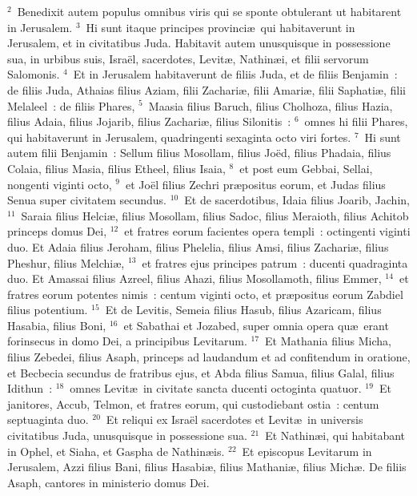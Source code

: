${}^{2}$~Benedixit autem populus omnibus viris qui se sponte obtulerant ut habitarent in Jerusalem.
${}^{3}$~Hi sunt itaque principes provinci\ae\ qui habitaverunt in Jerusalem, et in civitatibus Juda. Habitavit autem unusquisque in possessione sua, in urbibus suis, Isra\"el, sacerdotes, Levit\ae , Nathin\ae i, et filii servorum Salomonis.
${}^{4}$~Et in Jerusalem habitaverunt de filiis Juda, et de filiis Benjamin~: de filiis Juda, Athaias filius Aziam, filii Zachari\ae , filii Amari\ae , filii Saphati\ae , filii Melaleel~: de filiis Phares,
${}^{5}$~Maasia filius Baruch, filius Cholhoza, filius Hazia, filius Adaia, filius Jojarib, filius Zachari\ae , filius Silonitis~:
${}^{6}$~omnes hi filii Phares, qui habitaverunt in Jerusalem, quadringenti sexaginta octo viri fortes.
${}^{7}$~Hi sunt autem filii Benjamin~: Sellum filius Mosollam, filius Jo\"ed, filius Phadaia, filius Colaia, filius Masia, filius Etheel, filius Isaia,
${}^{8}$~et post eum Gebbai, Sellai, nongenti viginti octo,
${}^{9}$~et Jo\"el filius Zechri pr\ae positus eorum, et Judas filius Senua super civitatem secundus.
${}^{10}$~Et de sacerdotibus, Idaia filius Joarib, Jachin,
${}^{11}$~Saraia filius Helci\ae , filius Mosollam, filius Sadoc, filius Meraioth, filius Achitob princeps domus Dei,
${}^{12}$~et fratres eorum facientes opera templi~: octingenti viginti duo. Et Adaia filius Jeroham, filius Phelelia, filius Amsi, filius Zachari\ae , filius Pheshur, filius Melchi\ae ,
${}^{13}$~et fratres ejus principes patrum~: ducenti quadraginta duo. Et Amassai filius Azreel, filius Ahazi, filius Mosollamoth, filius Emmer,
${}^{14}$~et fratres eorum potentes nimis~: centum viginti octo, et pr\ae positus eorum Zabdiel filius potentium.
${}^{15}$~Et de Levitis, Semeia filius Hasub, filius Azaricam, filius Hasabia, filius Boni,
${}^{16}$~et Sabathai et Jozabed, super omnia opera qu\ae\ erant forinsecus in domo Dei, a principibus Levitarum.
${}^{17}$~Et Mathania filius Micha, filius Zebedei, filius Asaph, princeps ad laudandum et ad confitendum in oratione, et Becbecia secundus de fratribus ejus, et Abda filius Samua, filius Galal, filius Idithun~:
${}^{18}$~omnes Levit\ae\ in civitate sancta ducenti octoginta quatuor.
${}^{19}$~Et janitores, Accub, Telmon, et fratres eorum, qui custodiebant ostia~: centum septuaginta duo.
${}^{20}$~Et reliqui ex Isra\"el sacerdotes et Levit\ae\ in universis civitatibus Juda, unusquisque in possessione sua.
${}^{21}$~Et Nathin\ae i, qui habitabant in Ophel, et Siaha, et Gaspha de Nathin\ae is.
${}^{22}$~Et episcopus Levitarum in Jerusalem, Azzi filius Bani, filius Hasabi\ae , filius Mathani\ae , filius Mich\ae . De filiis Asaph, cantores in ministerio domus Dei.
